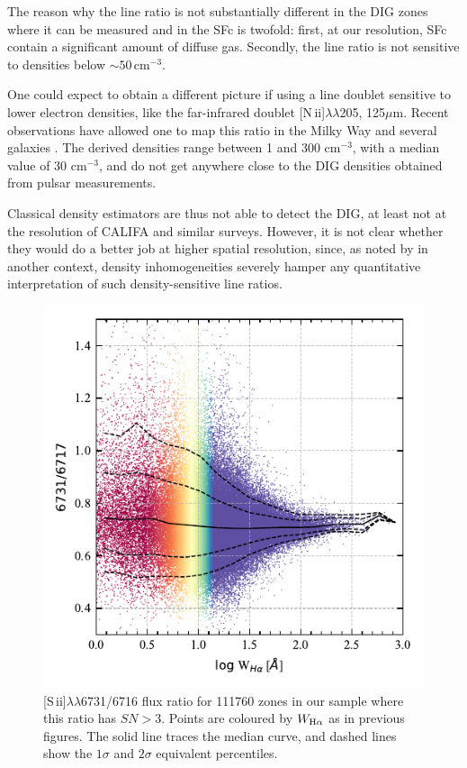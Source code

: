 \documentclass[a4paper, fleqn, usenatbib, useAMS]{mnras}
\newcommand{\Ha}{\ifmmode {\rm H}\alpha \else H$\alpha$\fi\xspace}
\newcommand{\sii}{\ifmmode [\rm{S}\,\textsc{ii}] \else [S\,{\sc ii}]\fi\xspace}
\begin{document}
The reason why the \sii line ratio is not substantially different in the DIG zones where it can be measured and in the SFc is twofold: first, at our resolution, SFc contain a significant amount of diffuse gas. Secondly, the \sii line ratio is not sensitive to densities below $\sim 50$\,cm$^{-3}$.

One could expect to obtain a different picture if using a line doublet sensitive to lower electron densities, like the far-infrared doublet [N\,{\sc ii}]$\lambda\lambda$205, 125$\mu$m. Recent observations have allowed one to map this ratio in the Milky Way and several galaxies \citep{Goldsmith.etal.2015, HerreraCamus.etal.2016}. The derived densities range between 1 and 300 cm$^{-3}$, with a median value of 30 cm$^{-3}$, and do not get anywhere close to the DIG densities obtained from pulsar measurements.

Classical density estimators are thus not able to detect the DIG, at least not at the resolution of CALIFA and similar surveys. However, it is not clear whether they would do a better job at higher spatial resolution, since, as noted by \citet{Rubin.1989} in another context, density inhomogeneities severely hamper any quantitative interpretation of such density-sensitive line ratios.

\begin{figure}
 \includegraphics{figs/fig_SII_logWHa_SNR3.pdf}
 \caption{[S\,{\sc ii}]$\lambda\lambda$6731/6716 flux ratio for 111760 zones in our sample where this ratio has $SN > 3$. Points are coloured by $W_{\Ha}$ as in previous figures. The solid line traces the median curve, and dashed lines show the $1\sigma$ and $2\sigma$ equivalent percentiles.}
 \label{fig:S2_x_WHa}
\end{figure}
\end{document}
